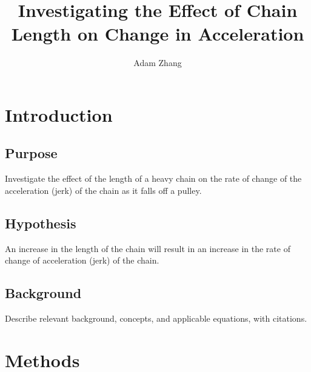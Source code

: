 \documentclass[stu,biblatex,floatsintext,draftall]{apa7}
\title{Investigating the Effect of Chain Length on Change in Acceleration}
\author{Adam Zhang}
\affiliation{Academies of Loudoun}
\begin{document}
\maketitle
\tableofcontents
\newpage

\section{Introduction}

\subsection{Purpose}
Investigate the effect of the length of a heavy chain on the rate of change of the acceleration (jerk) of the chain as it falls off a pulley.

\subsection{Hypothesis}
An increase in the length of the chain will result in an increase in the rate of change of acceleration (jerk) of the chain.

\subsection{Background}
Describe relevant background, concepts, and applicable equations, with citations.

\section{Methods}
\end{document}
